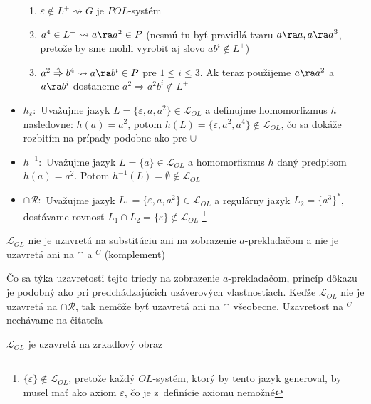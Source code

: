 \begin{dokaz}
\begin{itemize}
\begin{enumerate}
\item $\varepsilon\not\in L^{+}\rightsquigarrow G$ je $POL$-systém

\item $a^{4}\in L^{+}\rightsquigarrow a\ra a^{2}\in P$ (nesmú tu byť
pravidlá tvaru $a\ra a,a\ra a^{3}$, pretože by sme mohli vyrobiť
aj slovo $ab^{i}\not\in L^{+}$)

\item $a^{2}\overset{*}\Rightarrow b^{4}\rightsquigarrow a\ra b^{i}\in
P$ pre $1\leq i\leq3$. Ak teraz použijeme $a\ra a^{2}$ a $a\ra
b^{i}$ dostaneme $a^{2}\Rightarrow a^{2}b^{i}\not\in L^{+}$
\end{enumerate}

\item $h_{\varepsilon} :$ Uvažujme jazyk
$L=\{\varepsilon,a,a^{2}\}\in\mathcal{L}_{OL}$ a definujme
homomorfizmus $h$ nasledovne: $h(a)=a^{2}$, potom
$h(L)=\{\varepsilon,a^{2},a^{4}\}\not\in\mathcal{L}_{OL}$, čo sa
dokáže rozbitím na prípady podobne ako pre $\cup$
\item $h^{-1} :$ Uvažujme jazyk $L=\{a\}\in\mathcal{L}_{OL}$ a
homomorfizmus $h$ daný predpisom $h(a)=a^{2}$. Potom
$h^{-1}(L)=\emptyset\not\in\mathcal{L}_{OL}$
\item $\cap\mathcal{R} :$ Uvažujme jazyk
$L_{1}=\{\varepsilon,a,a^{2}\}\in\mathcal{L}_{OL}$ a regulárny
jazyk $L_{2}=\{a^{3}\}^{*}$, dostávame rovnosť $L_{1}\cap
L_{2}=\{\varepsilon\}\not\in\mathcal{L}_{OL}$
\footnote{$\{\varepsilon\}\not\in\mathcal{L}_{OL}$, pretože každý
$OL$-systém, ktorý by tento jazyk generoval, by musel mať ako
axiom $\varepsilon$, čo je \mbox{z definície} axiomu nemožné}
\end{itemize}
\end{dokaz}

\begin{dosledok}
$\mathcal{L}_{OL}$ nie je uzavretá na substitúciu ani na
zobrazenie $a$-prekladačom a nie je uzavretá ani na $\cap$ a
$^{C}$ (komplement)
\end{dosledok}

\begin{dokaz}
Čo sa týka uzavretosti tejto triedy na zobrazenie $a$-prekladačom,
princíp dôkazu je podobný ako pri predchádzajúcich uzáverových
vlastnostiach. Keďže $\mathcal{L}_{OL}$ nie je uzavretá na
$\cap\mathcal{R}$, tak nemôže byť uzavretá ani na $\cap$
všeobecne. Uzavretosť na $^{C}$ nechávame na čitateľa
\end{dokaz}

\begin{veta}
$\mathcal{L}_{OL}$ je uzavretá na zrkadlový obraz
\end{veta}


